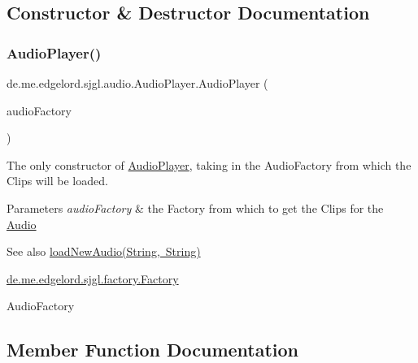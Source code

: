 \subsection{Constructor \& Destructor Documentation}
\mbox{\label{classde_1_1me_1_1edgelord_1_1sjgl_1_1audio_1_1_audio_player_aa2ce9d41080a96a25e09f9b0830e7b04}} 
\subsubsection{\texorpdfstring{Audio\+Player()}{AudioPlayer()}}
{\footnotesize\ttfamily de.\+me.\+edgelord.\+sjgl.\+audio.\+Audio\+Player.\+Audio\+Player (\begin{DoxyParamCaption}\item[{\mbox{\hyperlink{classde_1_1me_1_1edgelord_1_1sjgl_1_1factory_1_1_audio_factory}{Audio\+Factory}}}]{audio\+Factory }\end{DoxyParamCaption})}

The only constructor of \mbox{\hyperlink{classde_1_1me_1_1edgelord_1_1sjgl_1_1audio_1_1_audio_player}{Audio\+Player}}, taking in the {\ttfamily Audio\+Factory} from which the Clips will be loaded.


\begin{DoxyParams}{Parameters}
{\em audio\+Factory} & the {\ttfamily Factory} from which to get the Clips for the {\ttfamily \mbox{\hyperlink{classde_1_1me_1_1edgelord_1_1sjgl_1_1audio_1_1_audio}{Audio}}} \\
\hline
\end{DoxyParams}
\begin{DoxySeeAlso}{See also}
\mbox{\hyperlink{classde_1_1me_1_1edgelord_1_1sjgl_1_1audio_1_1_audio_player_a3fa42a34769a40aaf94c16e1589f7b09}{load\+New\+Audio(\+String, String)}} 

\mbox{\hyperlink{classde_1_1me_1_1edgelord_1_1sjgl_1_1factory_1_1_factory}{de.\+me.\+edgelord.\+sjgl.\+factory.\+Factory}} 

Audio\+Factory 
\end{DoxySeeAlso}


\subsection{Member Function Documentation}
\mbox{\label{classde_1_1me_1_1edgelord_1_1sjgl_1_1audio_1_1_audio_player_a3fa42a34769a40aaf94c16e1589f7b09}} 

